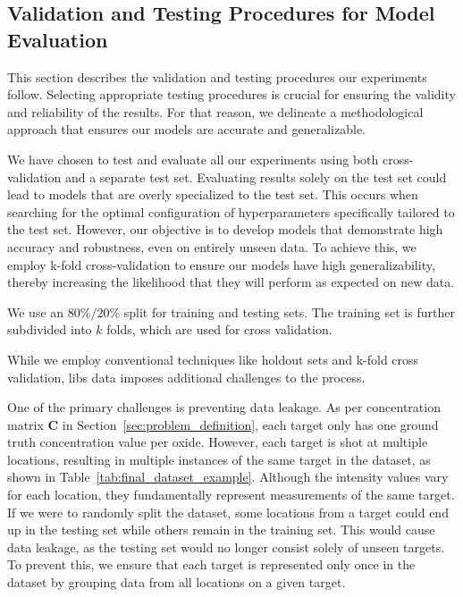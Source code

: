 \subsection{Validation and Testing Procedures for Model Evaluation}\label{subsec:validation_testing_procedures}
This section describes the validation and testing procedures our experiments follow.
Selecting appropriate testing procedures is crucial for ensuring the validity and reliability of the results.
For that reason, we delineate a methodological approach that ensures our models are accurate and generalizable.

We have chosen to test and evaluate all our experiments using both cross-validation and a separate test set.
Evaluating results solely on the test set could lead to models that are overly specialized to the test set.
This occurs when searching for the optimal configuration of hyperparameters specifically tailored to the test set.
However, our objective is to develop models that demonstrate high accuracy and robustness, even on entirely unseen data.
To achieve this, we employ k-fold cross-validation to ensure our models have high generalizability, thereby increasing the likelihood that they will perform as expected on new data.

We use an $80\%/20\%$ split for training and testing sets. The training set is further subdivided into $k$ folds, which are used for cross validation.

While we employ conventional techniques like holdout sets and k-fold cross validation, \gls{libs} data imposes additional challenges to the process.

One of the primary challenges is preventing data leakage.
As per concentration matrix $\mathbf{C}$ in Section~\ref{sec:problem_definition}, each target only has one ground truth concentration value per oxide.
However, each target is shot at multiple locations, resulting in multiple instances of the same target in the dataset, as shown in Table~\ref{tab:final_dataset_example}.
Although the intensity values vary for each location, they fundamentally represent measurements of the same target.
If we were to randomly split the dataset, some locations from a target could end up in the testing set while others remain in the training set.
This would cause data leakage, as the testing set would no longer consist solely of unseen targets.
To prevent this, we ensure that each target is represented only once in the dataset by grouping data from all locations on a given target.

